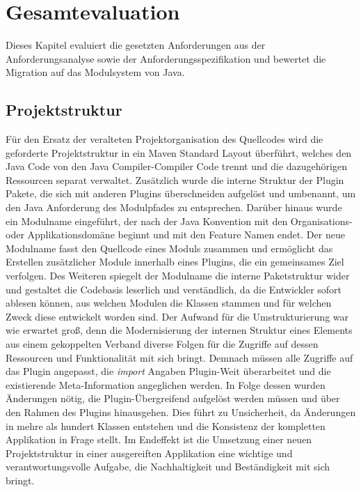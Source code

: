 \chapter{Gesamtevaluation}
Dieses Kapitel evaluiert die gesetzten Anforderungen aus der Anforderungsanalyse sowie der Anforderungsspezifikation und bewertet die Migration auf das Modulsystem von Java.\bigbreak	

\section{Projektstruktur}
Für den Ersatz der veralteten Projektorganisation des Quellcodes wird die geforderte Projektstruktur in ein Maven Standard Layout überführt, welches den Java Code von den Java Compiler-Compiler Code trennt und die dazugehörigen Ressourcen separat verwaltet. Zusätzlich wurde die interne Struktur der Plugin Pakete, die sich mit anderen Plugins überschneiden aufgelöst und umbenannt, um den Java Anforderung des Modulpfades zu entsprechen. Darüber hinaus wurde ein Modulname eingeführt, der nach der Java Konvention mit den Organisations- oder Applikationsdomäne beginnt und mit den Feature Namen endet. Der neue Modulname fasst den Quellcode eines Moduls zusammen und ermöglicht das Erstellen zusätzlicher Module innerhalb eines Plugins, die ein gemeinsames Ziel verfolgen. Des Weiteren spiegelt der Modulname die interne Paketstruktur wider und gestaltet die Codebasis leserlich und verständlich, da die Entwickler sofort ablesen können, aus welchen Modulen die Klassen stammen und für welchen Zweck diese entwickelt worden sind.\newline
Der Aufwand für die Umstrukturierung war wie erwartet groß, denn die Modernisierung der internen Struktur eines Elements aus einem gekoppelten Verband diverse Folgen für die Zugriffe auf dessen Ressourcen und Funktionalität mit sich bringt. Demnach müssen alle Zugriffe auf das Plugin angepasst, die \textit{import} Angaben Plugin-Weit überarbeitet und die existierende Meta-Information angeglichen werden. In Folge dessen wurden Änderungen nötig, die Plugin-Übergreifend aufgelöst werden müssen und über den Rahmen des Plugins hinausgehen. Dies führt zu Unsicherheit, da Änderungen in mehre als hundert Klassen entstehen und die Konsistenz der kompletten Applikation in Frage stellt. \newline
Im Endeffekt ist die Umsetzung einer neuen Projektstruktur in einer ausgereiften Applikation eine wichtige und verantwortungsvolle Aufgabe, die  Nachhaltigkeit und Beständigkeit mit sich bringt.\bigbreak

